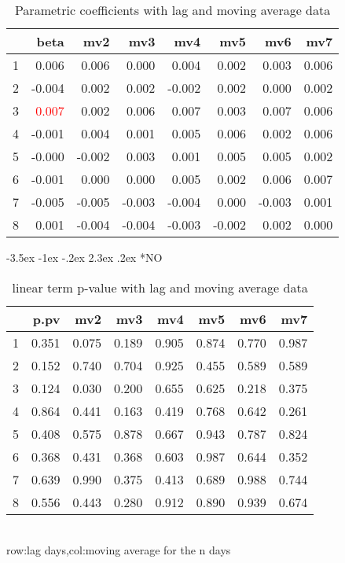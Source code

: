 \documentclass[a4paper, 12pt]{article}
\makeatletter
\def\large{\fontsize{14}{20}\selectfont}
\renewcommand\subsection{\@startsection {subsection}{1}{\z@}%
                                   {-3.5ex \@plus -1ex \@minus -.2ex}%
                                   {2.3ex \@plus.2ex}%
                                   {\centering\normalfont\large\bfseries}}
\makeatother
\begin{document}
\begin{table}[h]
\centering
\caption{Parametric coefficients with lag and moving average data}
\begin{tabular}{rrrrrrrr}
  \hline
 & beta & mv2 & mv3 & mv4 & mv5 & mv6 & mv7 \\
  \hline
1 & 0.006 & 0.006 & 0.000 & 0.004 & 0.002 & 0.003 & 0.006 \\
  2 & -0.004 & 0.002 & 0.002 & -0.002 & 0.002 & 0.000 & 0.002 \\
  3 & \textcolor{red}{0.007} & 0.002 & 0.006 & 0.007 & 0.003 & 0.007 & 0.006 \\
  4 & -0.001 & 0.004 & 0.001 & 0.005 & 0.006 & 0.002 & 0.006 \\
  5 & -0.000 & -0.002 & 0.003 & 0.001 & 0.005 & 0.005 & 0.002 \\
  6 & -0.001 & 0.000 & 0.000 & 0.005 & 0.002 & 0.006 & 0.007 \\
  7 & -0.005 & -0.005 & -0.003 & -0.004 & 0.000 & -0.003 & 0.001 \\
  8 & 0.001 & -0.004 & -0.004 & -0.003 & -0.002 & 0.002 & 0.000 \\
   \hline
\end{tabular}
\end{table}
\clearpage
\subsection*{NO}
\begin{table}[h]
\centering
\caption{linear term p-value with lag and moving average data}
\begin{tabular}{rrrrrrrr}
  \hline
 & p.pv & mv2 & mv3 & mv4 & mv5 & mv6 & mv7 \\
  \hline
1 & 0.351 & 0.075 & 0.189 & 0.905 & 0.874 & 0.770 & 0.987 \\
  2 & 0.152 & 0.740 & 0.704 & 0.925 & 0.455 & 0.589 & 0.589 \\
  3 & 0.124 & 0.030 & 0.200 & 0.655 & 0.625 & 0.218 & 0.375 \\
  4 & 0.864 & 0.441 & 0.163 & 0.419 & 0.768 & 0.642 & 0.261 \\
  5 & 0.408 & 0.575 & 0.878 & 0.667 & 0.943 & 0.787 & 0.824 \\
  6 & 0.368 & 0.431 & 0.368 & 0.603 & 0.987 & 0.644 & 0.352 \\
  7 & 0.639 & 0.990 & 0.375 & 0.413 & 0.689 & 0.988 & 0.744 \\
  8 & 0.556 & 0.443 & 0.280 & 0.912 & 0.890 & 0.939 & 0.674 \\
   \hline
\end{tabular}
\\row:lag days,col:moving average for the n days
\end{table}
\end{document}
